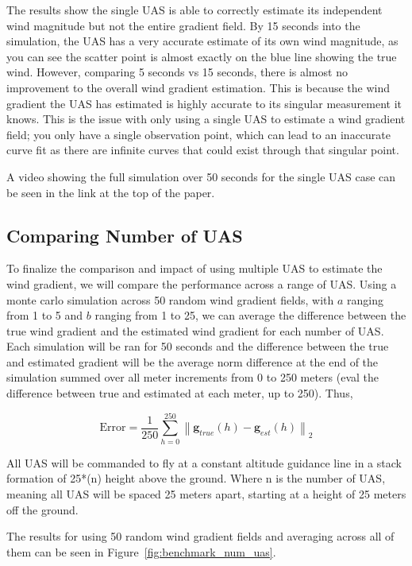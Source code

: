 The results show the single UAS is able to correctly estimate its independent wind magnitude but not the entire gradient field.
By 15 seconds into the simulation, the UAS has a very accurate estimate of its own wind magnitude, as you can see the scatter point is almost exactly on the blue line showing the true wind. 
However, comparing 5 seconds vs 15 seconds, there is almost no improvement to the overall wind gradient estimation.
This is because the wind gradient the UAS has estimated is highly accurate to its singular measurement it knows.
This is the issue with only using a single UAS to estimate a wind gradient field; you only have a single observation point, which can lead to an inaccurate curve fit as there are infinite curves that could exist through that singular point.

A video showing the full simulation over 50 seconds for the single UAS case can be seen in the link at the top of the paper.

\subsection{Comparing Number of UAS}

To finalize the comparison and impact of using multiple UAS to estimate the wind gradient, we will compare the performance across a range of UAS.
Using a monte carlo simulation across 50 random wind gradient fields, with $a$ ranging from 1 to 5 and $b$ ranging from 1 to 25, we can average the difference between the true wind gradient and the estimated wind gradient for each number of UAS.
Each simulation will be ran for 50 seconds and the difference between the true and estimated gradient will be the average norm difference at the end of the simulation summed over all meter increments from 0 to 250 meters (eval the difference between true and estimated at each meter, up to 250).
Thus, 

\begin{equation}
    \text{Error} = \frac{1}{250} \sum_{h=0}^{250} \left\| \mathbf{g}_{true}(h) - \mathbf{g}_{est}(h) \right\|_2
\end{equation}

All UAS will be commanded to fly at a constant altitude guidance line in a stack formation of 25*(n) height above the ground.
Where n is the number of UAS, meaning all UAS will be spaced 25 meters apart, starting at a height of 25 meters off the ground.

The results for using 50 random wind gradient fields and averaging across all of them can be seen in Figure~\ref{fig:benchmark_num_uas}.

